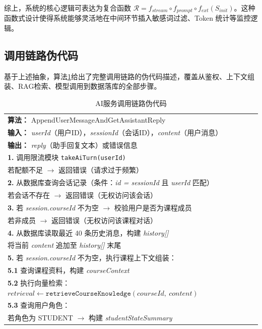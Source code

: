 \documentclass[12pt,a4paper,oneside]{ctexbook}
\numberwithin{equation}{chapter}
\begin{document}
综上，系统的核心逻辑可表达为复合函数 $\mathcal{R} = f_{stream} \circ f_{prompt} \circ f_{ext}(S_{init})$。这种函数式设计使得系统能够灵活地在中间环节插入敏感词过滤、Token 统计等监控逻辑。

\subsection{调用链路伪代码}

基于上述抽象，算法\ref{alg:chatPipeline}给出了完整调用链路的伪代码描述，覆盖从鉴权、上下文组装、RAG检索、模型调用到数据落库的全部步骤。

\begin{table}[H]
\centering
\caption{AI服务调用链路伪代码}
\label{alg:chatPipeline}
\begin{tabular}{p{13.5cm}}
\toprule
\textbf{算法：} AppendUserMessageAndGetAssistantReply \\
\textbf{输入：} \textit{userId}（用户ID），\textit{sessionId}（会话ID），\textit{content}（用户消息） \\
\textbf{输出：} \textit{reply}（助手回复文本）或错误信息 \\
\midrule
\textbf{1.} 调用限流模块 \texttt{takeAiTurn(userId)} \\
\quad 若配额不足 $\rightarrow$ 返回错误（请求过于频繁） \\[4pt]
\textbf{2.} 从数据库查询会话记录（条件：\textit{id = sessionId} 且 \textit{userId} 匹配） \\
\quad 若会话不存在 $\rightarrow$ 返回错误（无权访问该会话） \\[4pt]
\textbf{3.} 若 \textit{session.courseId} 不为空 $\rightarrow$ 校验用户是否为课程成员 \\
\quad 若非成员 $\rightarrow$ 返回错误（无权访问该课程对话） \\[4pt]
\textbf{4.} 从数据库读取最近 40 条历史消息，构建 \textit{history[]} \\
\quad 将当前 \textit{content} 追加至 \textit{history[]} 末尾 \\[4pt]
\textbf{5.} 若 \textit{session.courseId} 不为空，执行课程上下文组装： \\
\quad \textbf{5.1} 查询课程资料，构建 \textit{courseContext} \\
\quad \textbf{5.2} 执行向量检索：$retrieval \leftarrow \texttt{retrieveCourseKnowledge}(courseId,\ content)$ \\
\quad \textbf{5.3} 查询用户角色： \\
\qquad 若角色为 STUDENT $\rightarrow$ 构建 \textit{studentStateSummary} \\

\end{tabular}
\end{table}
\end{document}
